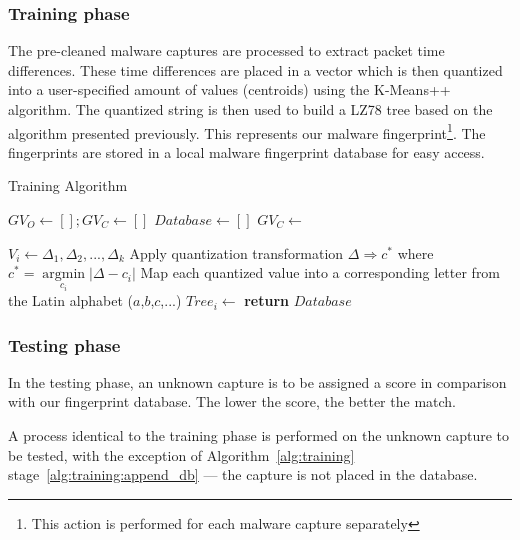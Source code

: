 \documentclass[13pt,journal,compsoc,onecolumn]{IEEEtran}
\begin{document}
\subsubsection{Training phase}\label{section:trainingp}
The pre-cleaned malware captures are processed to extract packet time differences.
These time differences are placed in a vector which is then quantized into a user-specified amount of values (centroids) using the K-Means++ algorithm. 
The quantized string is then used to build a LZ78 tree based on the algorithm presented previously. This represents our malware fingerprint\footnote{This action is performed for each malware capture separately}.
The fingerprints are stored in a local malware fingerprint database for easy access.
\begin{algorithm}
\caption{Training Algorithm}\label{alg:training}
\begin{algorithmic}[1]
\State ${GV}_O\gets[]; {GV}_C\gets[]$
\State ${Database}\gets[]$
   	\State {}
   \EndFor
   \State ${GV}_C\gets$

   	\State $V_i\gets\Delta_1,\Delta_2,...,\Delta_k$
   	\State Apply quantization transformation $
   	\Delta  \Rightarrow {c^*}$ 
    where ${c^*} = \mathop {\arg \min }\limits_{{c_i}} \left| {\Delta  - {c_i}} \right|$
   	\State Map each quantized value  into a corresponding
   	letter from the Latin alphabet ($a$,$b$,$c$,...)
   	\State ${Tree}_i\gets$
    \State {} \label{alg:training:append_db}
   \EndFor
   \State \textbf{return} $Database$
\EndProcedure
\end{algorithmic}
\end{algorithm}
\subsubsection{Testing phase}
In the testing phase, an unknown capture is to be assigned a score in comparison with our fingerprint database. The lower the score, the better the match.

A process identical to the training phase is performed on the unknown capture to be tested, with the exception of Algorithm~\ref{alg:training} stage~\ref{alg:training:append_db} --- the capture is not placed in the database.
 
\end{document}
